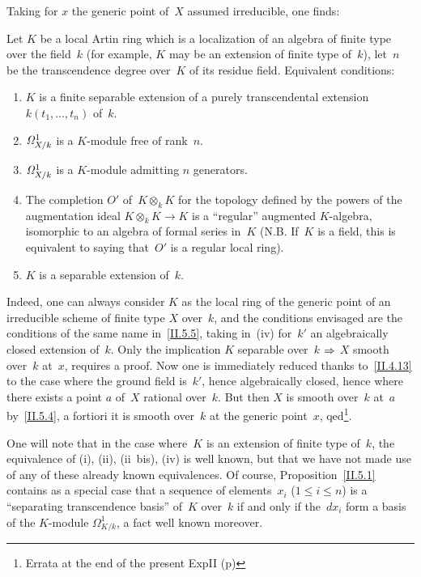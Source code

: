 Taking for $x$ the generic point of~$X$ assumed
irreducible, one finds:

\begin{corollary}
\label{II.5.6}
Let $K$ be a local Artin ring which is a localization of an algebra of
finite type over the field~$k$ (for example, $K$ may be an
extension of finite type of~$k$), let~$n$ be the transcendence
degree over~$K$ of its residue field. Equivalent conditions:
\begin{enumerate}
\item[(i)] $K$ is a finite separable extension of a purely
transcendental extension $k(t_1,\dots,t_n)$ of~$k$.
\item[(ii)]
$\it{\Omega}^1_{X/k}$
is a $K$-module free of rank~$n$.
\item[(ii~bis)]
$\it{\Omega}^1_{X/k}$
is a $K$-module admitting $n$
generators.
\item[(iii)] The completion $O'$ of~$K\otimes_k K$ for the
topology defined by the powers of the augmentation
ideal $K\otimes_k K\to K$ is a
``regular'' augmented
$K$-algebra,
\ie isomorphic to an
algebra of formal series in~$K$ (N.B. If~$K$ is a field,
this is equivalent to saying that~$O'$ is a
regular local ring).
\item[(iv)] $K$ is a separable extension of~$k$.
\end{enumerate}
\end{corollary}

Indeed, one can always consider $K$ as the local ring of the
generic point of an irreducible scheme of finite type
$X$ over~$k$, and the conditions envisaged are
the conditions of the same name in~\ref{II.5.5}, taking in~(iv)
for~$k'$ an algebraically closed extension of~$k$. Only
the implication $K$ separable over~$k$ $\To$ $X$ smooth over~$k$ at~$x$,
requires a proof. Now one is immediately
reduced thanks to~\ref{II.4.13} to the case where the ground
field is~$k'$, hence algebraically closed, hence where there exists a
point $a$ of~$X$ rational over~$k$. But then $X$ is smooth over~$k$
at~$a$ by~\ref{II.5.4}, a fortiori it is smooth over~$k$ at the
generic point~$x$, qed\footnote{\Cf Errata at the end of the present Exp\ptbl II
(p\ptbl \pageref{II.fin.errata})}.

One will note that in the case where~$K$ is an extension of finite
type of~$k$, the equivalence of
(i), (ii), (ii~bis), (iv)
is well
known, but that we have not made use of any of
these
already known
equivalences.
Of course,
Proposition~\ref{II.5.1} contains as a special case that a sequence
of elements~$x_i$ ($1\leq i\leq n$) is a ``separating
transcendence basis'' of~$K$ over~$k$ if and only if
the~$dx_i$ form a basis of the $K$-module $\Omega^1_{K/k}$, a fact well
known moreover.

